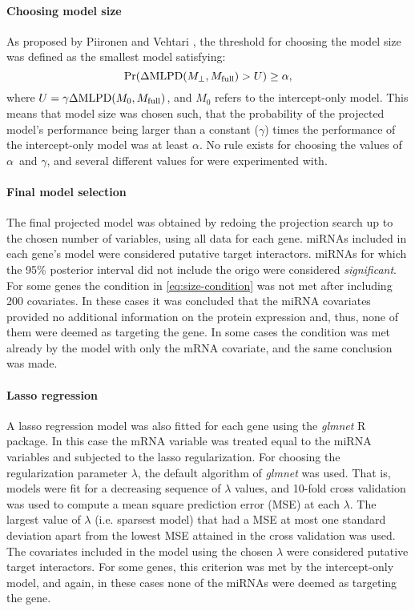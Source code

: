 \paragraph{Choosing model size}
As proposed by Piironen and Vehtari \citep{Piironen2016},
the threshold for choosing the model size was defined as the smallest
model satisfying:
\begin{equation}
	\label{eq:size-condition}
	\textup{Pr}(\Delta \textup{MLPD}(M_\perp,M_{\textup{full}}) > U) \geq \alpha,
\end{equation}
where $U = \gamma \Delta \textup{MLPD}(M_0,M_{\textup{full}})$, and
$M_0$ refers to the intercept-only model. This means that model
size was chosen such, that the probability of the projected model's
performance being larger than a constant ($\gamma$) times
the performance of the intercept-only model was at least $\alpha$.
No rule exists for choosing the values of $\alpha$ and $\gamma$, and
several different values for were experimented with.

\paragraph{Final model selection}
The final projected model was obtained by redoing the projection search up to
the chosen number of variables, using all data for each gene. miRNAs included
in each gene's model were considered putative target interactors. miRNAs for
which the 95\% posterior interval did not include the origo were considered
\emph{significant}. For some genes the condition in \eqref{eq:size-condition} was not
met after including 200 covariates. In these cases it was concluded that the
miRNA covariates provided no additional information on the protein expression
and, thus, none of them were deemed as targeting the gene. In some cases the
condition was met already by the model with only the mRNA covariate, and the
same conclusion was made.

\paragraph{Lasso regression}
A lasso regression model was also fitted for each gene using the
\emph{glmnet} R package. In this case the mRNA variable was treated equal
to the miRNA variables and subjected to the lasso regularization. For choosing
the regularization parameter $\lambda$, the default algorithm of \emph{glmnet}
was used. That is, models were fit for a decreasing sequence of $\lambda$
values, and 10-fold cross validation was used to compute a mean square
prediction error (MSE) at each $\lambda$. The largest value of $\lambda$ (i.e.
sparsest model) that had a MSE at most one standard deviation apart from the
lowest MSE attained in the cross validation was used. The covariates included
in the model using the chosen $\lambda$ were considered putative target
interactors. For some genes, this criterion was met by the intercept-only
model, and again, in these cases none of the miRNAs were deemed as targeting
the gene.



